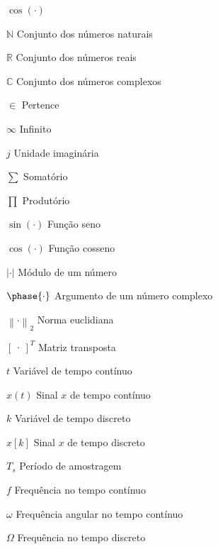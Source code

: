 \documentclass[repeatfields,oneside]{tcc}
\begin{document}
\begin{listofsymbols}{$ \cos(\cdot) $}



    \item[$ \mathbb{N} $] Conjunto dos números naturais
    \item[$ \mathbb{R} $] Conjunto dos números reais
    \item[$ \mathbb{C} $] Conjunto dos números complexos

    \item[$ \in $] Pertence

    \item[$ \infty $] Infinito
    \item[$ j $] Unidade imaginária

    \item[$ \sum $] Somatório
    \item[$ \prod $] Produtório

    \item[$ \sin(\cdot) $] Função seno
    \item[$ \cos(\cdot) $] Função cosseno

    \item[$ \left| \cdot \right| $] Módulo de um número
    \item[$ \phase{\cdot} $] Argumento de um número complexo

    \item[$ \left\lVert \cdot \right\rVert_2 $] Norma euclidiana

    \item[$ \begin{bmatrix} \cdot \end{bmatrix}^T $] Matriz transposta


    \item[$ t $] Variável de tempo contínuo
    \item[$ x(t) $] Sinal $x$ de tempo contínuo

    \item[$ k $] Variável de tempo discreto
    \item[$ x {[k]} $] Sinal $x$ de tempo discreto
    \item[$ T_s $] Período de amostragem

    \item[$ f $] Frequência no tempo contínuo
    \item[$ \omega $] Frequência angular no tempo contínuo
    \item[$ \Omega $] Frequência no tempo discreto



\end{listofsymbols}
\end{document}
